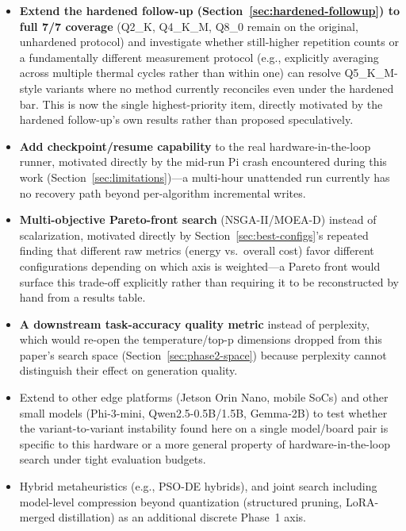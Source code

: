 \documentclass[journal]{IEEEtran}
\begin{document}
\begin{itemize}
  \item \textbf{Extend the hardened follow-up (Section~\ref{sec:hardened-followup}) to full 7/7 coverage} (Q2\_K, Q4\_K\_M, Q8\_0 remain on the original, unhardened protocol) and investigate whether still-higher repetition counts or a fundamentally different measurement protocol (e.g., explicitly averaging across multiple thermal cycles rather than within one) can resolve Q5\_K\_M-style variants where no method currently reconciles even under the hardened bar. This is now the single highest-priority item, directly motivated by the hardened follow-up's own results rather than proposed speculatively.
  \item \textbf{Add checkpoint/resume capability} to the real hardware-in-the-loop runner, motivated directly by the mid-run Pi crash encountered during this work (Section~\ref{sec:limitations})---a multi-hour unattended run currently has no recovery path beyond per-algorithm incremental writes.
  \item \textbf{Multi-objective Pareto-front search} (NSGA-II/MOEA-D) instead of scalarization, motivated directly by Section~\ref{sec:best-configs}'s repeated finding that different raw metrics (energy vs.\ overall cost) favor different configurations depending on which axis is weighted---a Pareto front would surface this trade-off explicitly rather than requiring it to be reconstructed by hand from a results table.
  \item \textbf{A downstream task-accuracy quality metric} instead of perplexity, which would re-open the temperature/top-p dimensions dropped from this paper's search space (Section~\ref{sec:phase2-space}) because perplexity cannot distinguish their effect on generation quality.
  \item Extend to other edge platforms (Jetson Orin Nano, mobile SoCs) and other small models (Phi-3-mini, Qwen2.5-0.5B/1.5B, Gemma-2B) to test whether the variant-to-variant instability found here on a single model/board pair is specific to this hardware or a more general property of hardware-in-the-loop search under tight evaluation budgets.
  \item Hybrid metaheuristics (e.g., PSO-DE hybrids), and joint search including model-level compression beyond quantization (structured pruning, LoRA-merged distillation) as an additional discrete Phase~1 axis.
\end{itemize}
\end{document}
